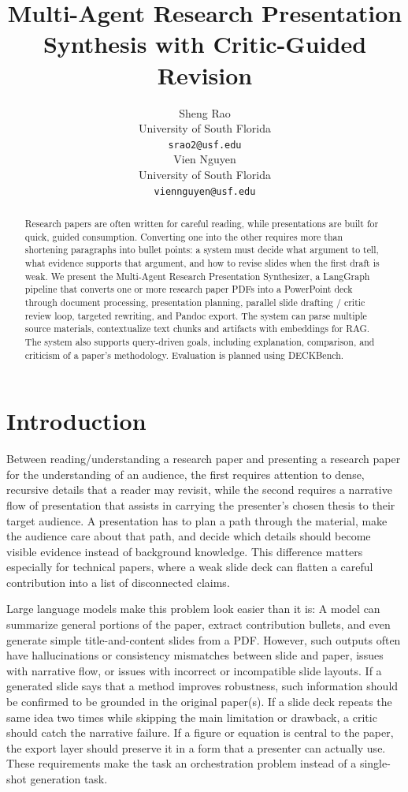 \documentclass[11pt]{article}
\title{Multi-Agent Research Presentation Synthesis with Critic-Guided Revision}
\author{Sheng Rao \\
  University of South Florida \\
  \texttt{srao2@usf.edu} \\\And
  Vien Nguyen \\
  University of South Florida \\
  \texttt{viennguyen@usf.edu} \\}
\begin{document}
\maketitle
\begin{abstract}
Research papers are often written for careful reading, while presentations are built for quick, guided consumption. Converting one into the other requires more than shortening paragraphs into bullet points: a system must decide what argument to tell, what evidence supports that argument, and how to revise slides when the first draft is weak. We present the Multi-Agent Research Presentation Synthesizer, a LangGraph pipeline that converts one or more research paper PDFs into a PowerPoint deck through document processing, presentation planning, parallel slide drafting / critic review loop, targeted rewriting, and Pandoc export. The system can parse multiple source materials, contextualize text chunks and artifacts with embeddings for RAG. The system also supports query-driven goals, including explanation, comparison, and criticism of a paper's methodology. Evaluation is planned using DECKBench.
\end{abstract}

\section{Introduction}

Between reading/understanding a research paper and presenting a research paper for the understanding of an audience, the first requires attention to dense, recursive details that a reader may revisit, while the second requires a narrative flow of presentation that assists in carrying the presenter's chosen thesis to their target audience.  A presentation has to plan a path through the material, make the audience care about that path, and decide which details should become visible evidence instead of background knowledge. This difference matters especially for technical papers, where a weak slide deck can flatten a careful contribution into a list of disconnected claims.

Large language models make this problem look easier than it is: A model can summarize general portions of the paper, extract contribution bullets, and even generate simple title-and-content slides from a PDF. However, such outputs often have hallucinations or consistency mismatches between slide and paper, issues with narrative flow, or issues with incorrect or incompatible slide layouts.  If a generated slide says that a method improves robustness, such information should be confirmed to be grounded in the original paper(s). If a slide deck repeats the same idea two times while skipping the main limitation or drawback, a critic should catch the narrative failure. If a figure or equation is central to the paper, the export layer should preserve it in a form that a presenter can actually use. These requirements make the task an orchestration problem instead of a single-shot generation task.
\end{document}
